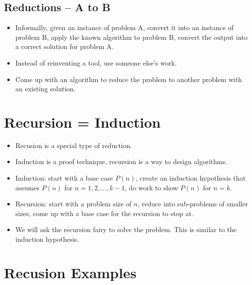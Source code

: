 \subsection{Reductions -- A to B}
\begin{itemize}
    \item Informally, given an instance of problem A, convert it into an instance of problem B, apply the known algorithm to problem B, convert the output into a correct solution for problem A.
    \item Instead of reinventing a tool, use someone else's work.
    \item Come up with an algorithm to reduce the problem to another problem with an existing solution.
\end{itemize}

\section{Recursion = Induction}
\begin{itemize}
    \item Recusion is a special type of reduction.
    \item Induction is a proof technique, recursion is a way to design algorithms.
    \item Induction: start with a base case $P(n)$, create an induction hypothesis that assumes $P(n)$ for $n = 1, 2, ..., k-1$, do work to show $P(n)$ for $n = k$.
    \item Recursion: start with a problem size of $n$, reduce into sub-problems of smaller sizes, come up with a base case for the recursion to stop at.
    \item We will ask the recursion fairy to solve the problem. This is similar to the induction hypothesis.
\end{itemize}

\section{Recusion Examples}

